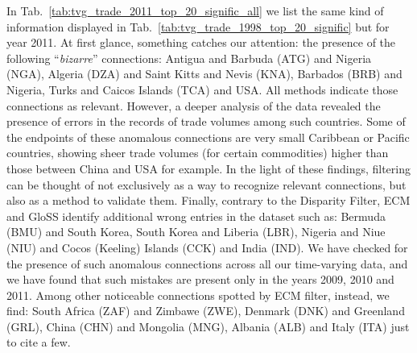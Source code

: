 \documentclass[aps,twocolumn,superscriptaddress]{revtex4-1}
\newcommand{\gloss}{GloSS }
\begin{document}
In Tab.~\ref{tab:tvg_trade_2011_top_20_signific_all} we list the same kind of information displayed in Tab.~\ref{tab:tvg_trade_1998_top_20_signific} but for year 2011. At first glance, something catches our attention: the presence of the following ``\emph{bizarre}'' connections: Antigua and Barbuda (ATG) and Nigeria (NGA), Algeria (DZA) and Saint Kitts and Nevis (KNA), Barbados (BRB) and Nigeria, Turks and Caicos Islands (TCA) and USA. All methods indicate those connections as relevant. However, a deeper analysis of the data revealed the presence of errors in the records of trade volumes among such countries. Some of the endpoints of these anomalous connections are very small Caribbean or Pacific countries, showing sheer trade volumes (for certain commodities) higher than those between China and USA for example. In the light of these findings, filtering can be thought of not exclusively as a way to recognize relevant connections, but also as a method to validate them. Finally, contrary to the Disparity Filter, ECM and \gloss identify additional wrong entries in the dataset such as: Bermuda (BMU) and South Korea, South Korea and Liberia (LBR), Nigeria and Niue (NIU) and Cocos (Keeling) Islands (CCK) and India (IND). We have checked for the presence of such anomalous connections across all our time-varying data, and we have found that such mistakes are present only in the years 2009, 2010 and 2011. Among other noticeable connections spotted by ECM filter, instead, we find: South Africa (ZAF) and Zimbawe (ZWE), Denmark (DNK) and Greenland (GRL), China (CHN) and Mongolia (MNG), Albania (ALB) and Italy (ITA) just to cite a few.
\end{document}

